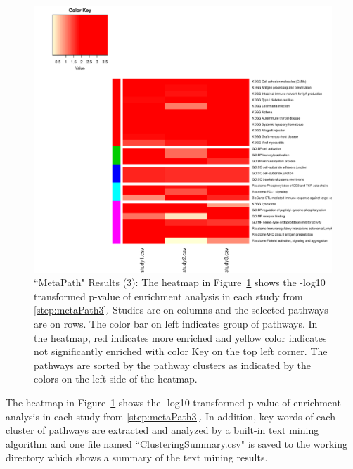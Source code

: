 \begin{figure}[H]
\begin{center}
\includegraphics[scale=0.6]{./figure/metaPath/Heatmap_clusters_all.pdf}
\caption{``MetaPath" Results (3):
The heatmap in Figure~\ref{fig:MetaPathresult3} shows the -log10 transformed p-value of enrichment analysis in each study from \ref{step:metaPath3}. 
Studies are on columns and the selected pathways are on rows. 
The color bar on left indicates group of pathways.
In the heatmap, red indicates more enriched and yellow color indicates not significantly enriched with color Key on the top left corner. 
The pathways are sorted by the pathway clusters as indicated by the colors on the left side of the heatmap.}
\label{fig:MetaPathresult3}
\end{center}
\end{figure}


The heatmap in Figure~\ref{fig:MetaPathresult3} shows the -log10 transformed p-value of enrichment analysis in each study from \ref{step:metaPath3}. 
In addition, 
key words of each cluster of pathways are extracted and analyzed by a built-in text mining algorithm and one file named ``Clustering\textunderscore Summary.csv" is saved to the working directory which shows a summary of the text mining results. 


